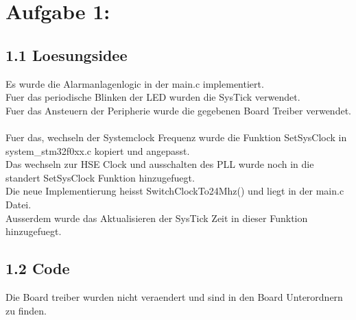 \documentclass{report}
\newcommand{\name}{Marco Söllinger,}
\newcommand{\matnr}{s2410306011, Gruppe 1}
\begin{document}


\section*{Aufgabe 1:}

\subsection*{1.1 Loesungsidee}
Es wurde die Alarmanlagenlogic in der main.c implementiert.\\
Fuer das periodische Blinken der LED wurden die SysTick verwendet.\\
Fuer das Ansteuern der Peripherie wurde die gegebenen Board Treiber verwendet.\\\\
Fuer das, wechseln der Systemclock Frequenz wurde die Funktion SetSysClock in system\_stm32f0xx.c kopiert und angepasst.\\
Das wechseln zur HSE Clock und ausschalten des PLL wurde noch in die standert SetSysClock Funktion hinzugefuegt.\\
Die neue Implementierung heisst SwitchClockTo24Mhz() und liegt in der main.c Datei.\\
Ausserdem wurde das Aktualisieren der SysTick Zeit in dieser Funktion hinzugefuegt.\\


\subsection*{1.2 Code}
Die Board treiber wurden nicht veraendert und sind in den Board Unterordnern zu finden.\\


\end{document}
